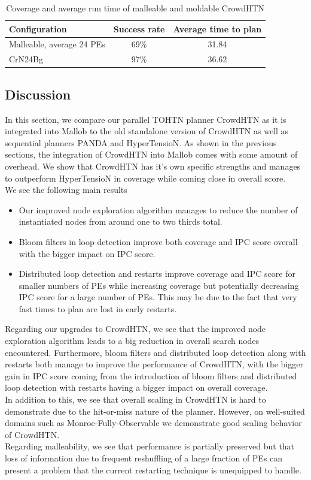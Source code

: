 \begin{table}[!hbp]
	\caption{Coverage and average run time of malleable and moldable CrowdHTN}
	\label{table: malleability}
	\centering
	
	\begin{tabular}{|l|c|c|}
		\hline
		Configuration & Success rate & Average time to plan \\
		\hline
		Malleable, average 24 PEs	& 69\%	& 31.84 \\
		CrN24Bg						& 97\%  & 36.62 \\
		\hline
	\end{tabular}
\end{table}

\subsection{Discussion}
\label{eval: conclusion}
In this section, we compare our parallel TOHTN planner CrowdHTN as it is integrated into Mallob to the old standalone version of CrowdHTN as well as sequential planners PANDA and HyperTensioN. As shown in the previous sections, the integration of CrowdHTN into Mallob comes with some amount of overhead. We show that CrowdHTN has it's own specific strengths and manages to outperform HyperTensioN in coverage while coming close in overall score. \\
We see the following main results
\begin{itemize}
	\item Our improved node exploration algorithm manages to reduce the number of instantiated nodes from around one to two thirds total.
	\item Bloom filters in loop detection improve both coverage and IPC score overall with the bigger impact on IPC score.
	\item Distributed loop detection and restarts improve coverage and IPC score for smaller numbers of PEs while increasing coverage but potentially decreasing IPC score for a large number of PEs. This may be due to the fact that very fast times to plan are lost in early restarts.
\end{itemize}
Regarding our upgrades to CrowdHTN, we see that the improved node exploration algorithm leads to a big reduction in overall search nodes encountered. Furthermore, bloom filters and distributed loop detection along with restarts both manage to improve the performance of CrowdHTN, with the bigger gain in IPC score coming from the introduction of bloom filters and distributed loop detection with restarts having a bigger impact on overall coverage. \\
In addition to this, we see that overall scaling in CrowdHTN is hard to demonstrate due to the hit-or-miss nature of the planner. However, on well-suited domains such as Monroe-Fully-Observable we demonstrate good scaling behavior of CrowdHTN. \\
Regarding malleability, we see that performance is partially preserved but that loss of information due to frequent reshuffling of a large fraction of PEs can present a problem that the current restarting technique is unequipped to handle.
\clearpage

